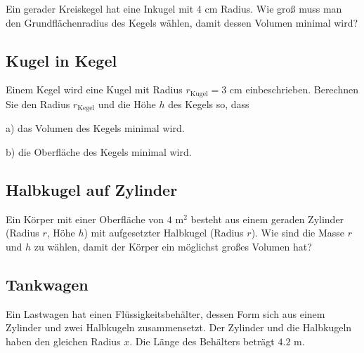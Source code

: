Ein gerader Kreiskegel hat eine Inkugel mit $4 \text{ cm}$
Radius. Wie groß muss man den Grundflächenradius des Kegels wählen, damit dessen Volumen minimal wird?




\subsection{Kugel in Kegel}
Einem Kegel wird eine Kugel mit Radius $r_{\text{Kugel}} = 3 \text{ cm}$
einbeschrieben. Berechnen Sie den Radius $r_{\text{Kegel}}$ und die
Höhe $h$ des Kegels so,
dass

a) das Volumen des Kegels minimal wird.

b) die Oberfläche des Kegels minimal wird.



\subsection{Halbkugel auf Zylinder}
Ein Körper mit einer Oberfläche von $4 \text{ m}^2$ besteht aus einem geraden Zylinder (Radius $r$, Höhe $h$) mit aufgesetzter Halbkugel (Radius $r$). Wie sind die Masse $r$ und $h$ zu wählen, damit der Körper ein möglichst großes Volumen hat?


\subsection{Tankwagen}

Ein Lastwagen hat einen Flüssigkeitsbehälter, dessen
Form sich aus einem Zylinder und zwei Halbkugeln zusammensetzt. Der Zylinder und die Halbkugeln haben den
gleichen Radius $x$. Die Länge des Behälters beträgt $4.2 \text{ m}$.

